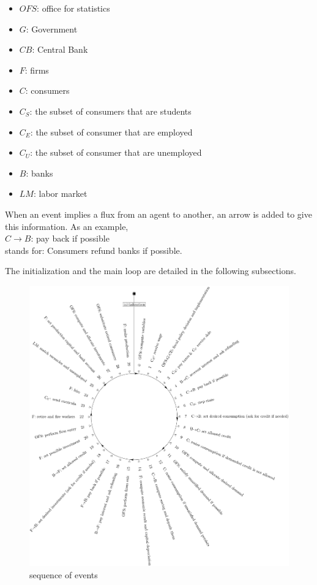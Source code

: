 \documentclass{book}
\begin{document}
\begin{itemize}
	\item $OFS$: office for statistics
	\item $G$: Government
	\item $CB$: Central Bank
	\item $F$: firms
	\item $C$: consumers
	\item $C_S$: the subset of consumers that are students
	\item $C_E$: the subset of consumer that are employed
	\item $C_U$: the subset of consumer that are unemployed
	\item $B$: banks
	\item $LM$: labor market
\end{itemize}

When an event implies a flux from an agent to another, an arrow is added to give this information. As an example,\\
$C \rightarrow B$: pay back if possible\\
stands for: Consumers refund banks if possible.

The initialization and the main loop are detailed in the following subsections.

\begin{figure}[htp]
	\centering
\includegraphics[scale=0.5]{visual.pdf}
	\caption{sequence of events}
	\label{fig:sequence}
\end{figure}
\end{document}
